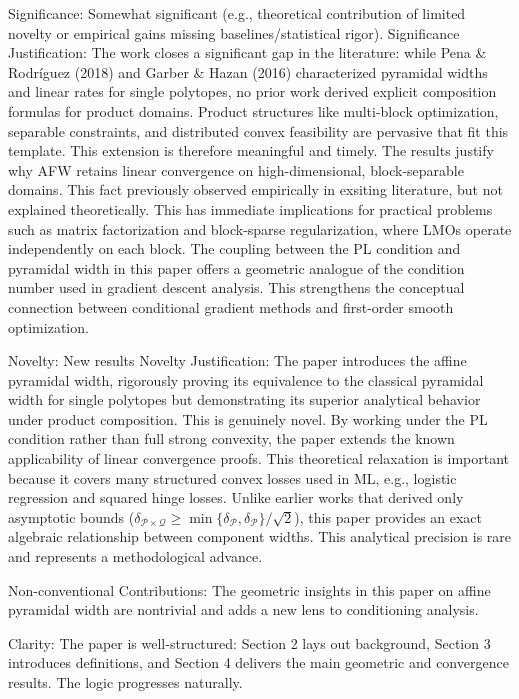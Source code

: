 \documentclass[a4wide]{article}
\begin{document}
Significance: Somewhat significant (e.g., theoretical contribution of limited novelty or empirical gains missing baselines/statistical rigor).
Significance Justification:
The work closes a significant gap in the literature: while Pena \& Rodríguez (2018) and Garber \& Hazan (2016) characterized pyramidal widths and linear rates for single polytopes, no prior work derived explicit composition formulas for product domains. Product structures like multi-block optimization, separable constraints, and distributed convex feasibility are pervasive that fit this template. This extension is therefore meaningful and timely.
The results justify why AFW retains linear convergence on high-dimensional, block-separable domains. This fact previously observed empirically in exsiting literature, but not explained theoretically. This has immediate implications for practical problems such as matrix factorization and block-sparse regularization, where LMOs operate independently on each block.
The coupling between the PL condition and pyramidal width in this paper offers a geometric analogue of the condition number used in gradient descent analysis. This strengthens the conceptual connection between conditional gradient methods and first-order smooth optimization.

Novelty: New results
Novelty Justification:
The paper introduces the affine pyramidal width, rigorously proving its equivalence to the classical pyramidal width for single polytopes but demonstrating its superior analytical behavior under product composition. This is genuinely novel.
By working under the PL condition rather than full strong convexity, the paper extends the known applicability of linear convergence proofs. This theoretical relaxation is important because it covers many structured convex losses used in ML, e.g., logistic regression and squared hinge losses.
Unlike earlier works that derived only asymptotic bounds ($\delta_{\mathcal{P} \times \mathcal{Q}} \ge  \min\{\delta_{\mathcal{P}}, \delta_{\mathcal{P}}\} / \sqrt{2}$), this paper provides an exact algebraic relationship between component widths. This analytical precision is rare and represents a methodological advance.

Non-conventional Contributions:
The geometric insights in this paper on affine pyramidal width are nontrivial and adds a new lens to conditioning analysis.

Clarity:
The paper is well-structured: Section 2 lays out background, Section 3 introduces definitions, and Section 4 delivers the main geometric and convergence results. The logic progresses naturally.
\end{document}
